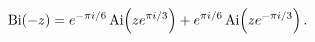 \[\mathop{\mathrm{Bi}\/}\nolimits\!\left(-z\right)=e^{-\pi i/6}\mathop{\mathrm{%
Ai}\/}\nolimits\!\left(ze^{\pi i/3}\right)+e^{\pi i/6}\mathop{\mathrm{Ai}\/}%
\nolimits\!\left(ze^{-\pi i/3}\right).\]